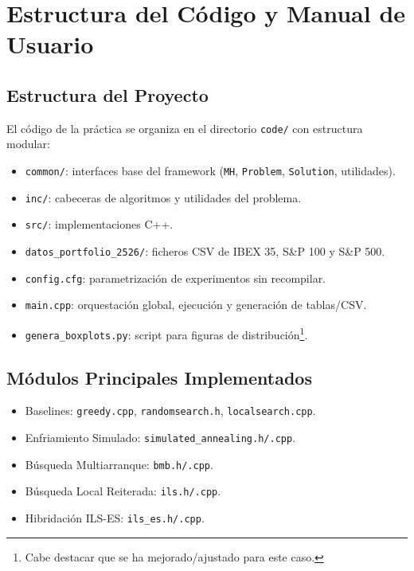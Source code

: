\newpage
\section{Estructura del Código y Manual de Usuario}
\label{sec:manual}

\subsection{Estructura del Proyecto}

El código de la práctica se organiza en el directorio \texttt{code/} con estructura
modular:

\begin{itemize}[noitemsep]
    \item \texttt{common/}: interfaces base del framework (\texttt{MH}, \texttt{Problem}, \texttt{Solution}, utilidades).
    \item \texttt{inc/}: cabeceras de algoritmos y utilidades del problema.
    \item \texttt{src/}: implementaciones C++.
    \item \texttt{datos\_portfolio\_2526/}: ficheros CSV de IBEX 35, S\&P 100 y S\&P 500.
    \item \texttt{config.cfg}: parametrización de experimentos sin recompilar.
    \item \texttt{main.cpp}: orquestación global, ejecución y generación de tablas/CSV.
    \item \texttt{genera\_boxplots.py}: script para figuras de distribución\footnote{Cabe destacar que se ha mejorado/ajustado para este caso.}.
\end{itemize}

\subsection{Módulos Principales Implementados}

\begin{itemize}[noitemsep]
    \item Baselines: \texttt{greedy.cpp}, \texttt{randomsearch.h}, \texttt{localsearch.cpp}.
    \item Enfriamiento Simulado: \texttt{simulated\_annealing.h/.cpp}.
    \item Búsqueda Multiarranque: \texttt{bmb.h/.cpp}.
    \item Búsqueda Local Reiterada: \texttt{ils.h/.cpp}.
    \item Hibridación ILS-ES: \texttt{ils\_es.h/.cpp}.
\end{itemize}

